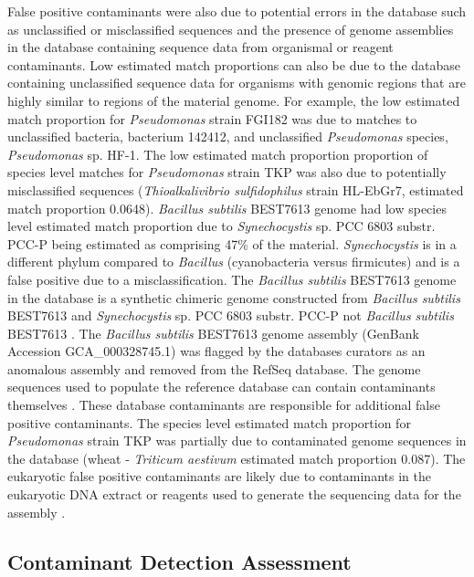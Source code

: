 \documentclass[fleqn,10pt,lineno]{wlpeerj}\usepackage[]{graphicx}\usepackage[]{color}
\begin{document}
False positive contaminants were also due to potential errors in the database such as unclassified or misclassified sequences and the presence of genome assemblies in the database containing sequence data from organismal or reagent contaminants.
Low estimated match proportions can also be due to the database containing unclassified sequence data for organisms with genomic regions that are highly similar to regions of the material genome.
For example, the low estimated match proportion for \textit{Pseudomonas} strain FGI182 was due to matches to unclassified bacteria, bacterium 142412, and unclassified \textit{Pseudomonas} species, \textit{Pseudomonas} sp. HF-1.
The low estimated match proportion proportion of species level matches for \textit{Pseudomonas} strain TKP was also due to potentially misclassified sequences (\textit{Thioalkalivibrio sulfidophilus} strain HL-EbGr7, estimated match proportion 0.0648).
\textit{Bacillus subtilis} BEST7613 genome had low species level estimated match proportion due to \textit{Synechocystis} sp. PCC 6803 substr. PCC-P being estimated as comprising 47\% of the material.
\textit{Synechocystis} is in a different phylum compared to \textit{Bacillus} (cyanobacteria versus firmicutes) and is a false positive due to a misclassification.
The \textit{Bacillus subtilis} BEST7613 genome in the database is a synthetic chimeric genome constructed from \textit{Bacillus subtilis} BEST7613 and \textit{Synechocystis} sp. PCC 6803 substr. PCC-P not \textit{Bacillus subtilis} BEST7613 \citep{watanabe2012complete}. 
The \textit{Bacillus subtilis} BEST7613 genome assembly (GenBank Accession GCA\_000328745.1) was flagged by the databases curators as an anomalous assembly and removed from the RefSeq database.  
The genome sequences used to populate the reference database can contain contaminants themselves \citep{parks2015checkm}.
These database contaminants are responsible for additional false positive contaminants.
The species level estimated match proportion for \textit{Pseudomonas} strain TKP was partially due to contaminated genome sequences in the database (wheat - \textit{Triticum aestivum} estimated match proportion 0.087).
The eukaryotic false positive contaminants are likely due to contaminants in the eukaryotic DNA extract or reagents used to generate the sequencing data for the assembly \citep{parks2015checkm}.

\subsection*{Contaminant Detection Assessment}
\end{document}
